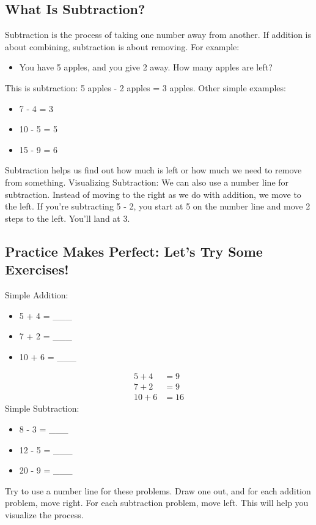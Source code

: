 \documentclass{book}
\begin{document}
\usetikzlibrary{arrows}


\subsection{What Is Subtraction?}
Subtraction is the process of taking one number away from another. If addition is about combining, subtraction is about removing.
For example:
\begin{itemize}
	\item You have 5 apples, and you give 2 away. How many apples are left?
\end{itemize}
This is subtraction: 5 apples - 2 apples = 3 apples.
Other simple examples:
\begin{itemize}
	\item 7 - 4 = 3
	\item 10 - 5 = 5
	\item 15 - 9 = 6
\end{itemize}
Subtraction helps us find out how much is left or how much we need to remove from something.
Visualizing Subtraction: We can also use a number line for subtraction. Instead of moving to the right as we do with addition, we move to the left.
If you’re subtracting 5 - 2, you start at 5 on the number line and move 2 steps to the left. You’ll land at 3.

\subsection{Practice Makes Perfect: Let’s Try Some Exercises!}
Simple Addition:
\begin{itemize}
	\item 5 + 4 = \_\_\_
	\item 7 + 2 = \_\_\_
	\item 10 + 6 = \_\_\_
\end{itemize}
\begin{subequations}
\begin{align}    
	5 + 4 &= 9 \\
	7 + 2 &= 9 \\
	10 + 6 &= 16
\end{align}
\end{subequations}
Simple Subtraction:
\begin{itemize}
	\item 8 - 3 = \_\_\_
	\item 12 - 5 = \_\_\_
	\item 20 - 9 = \_\_\_
\end{itemize}
Try to use a number line for these problems. Draw one out, and for each addition problem, move right. For each subtraction problem, move left. This will help you visualize the process.
\end{document}
